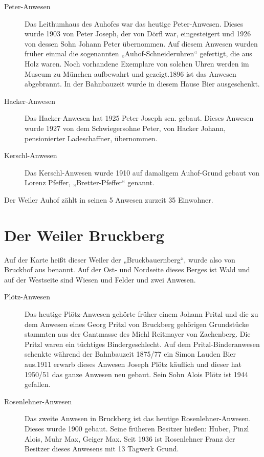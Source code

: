 \documentclass[12pt,a4pager,draft]{book}
\begin{document}
\begin{description}
\item[Peter-Anwesen] Das Leithumhaus des Auhofes war das heutige Peter-Anwesen.
Dieses wurde 1903 von Peter Joseph, der von Dörfl war, eingesteigert und 1926
von dessen Sohn Johann Peter übernommen. Auf diesem Anwesen wurden früher einmal
die sogenannten „Auhof-Schneideruhren“ gefertigt, die aus Holz waren. Noch
vorhandene Exemplare von solchen Uhren werden im Museum zu München aufbewahrt
und gezeigt.1896 ist das Anwesen abgebrannt. In der Bahnbauzeit wurde in diesem
Hause Bier ausgeschenkt.

\item[Hacker-Anwesen] Das Hacker-Anwesen hat 1925 Peter Joseph sen. gebaut.
Dieses Anwesen wurde 1927 von dem Schwiegersohne Peter, von Hacker Johann,
pensionierter Ladeschaffner, übernommen.

\item[Kerschl-Anwesen] Das Kerschl-Anwesen wurde 1910 auf damaligem Auhof-Grund
gebaut von Lorenz Pfeffer, „Bretter-Pfeffer“ genannt.
\end{description}

Der Weiler Auhof zählt in seinen 5 Anwesen zurzeit 35 Einwohner.

\section{Der Weiler Bruckberg}

Auf der Karte heißt dieser Weiler der „Bruckbauernberg“, wurde also von Bruckhof
aus benannt. Auf der Ost- und Nordseite dieses Berges ist Wald und auf der
Westseite sind Wiesen und Felder und zwei Anwesen.

\begin{description}
\item[Plötz-Anwesen] Das heutige Plötz-Anwesen gehörte früher einem Johann
Pritzl und die zu dem Anwesen eines Georg Pritzl von Bruckberg gehörigen
Grundstücke stammten aus der Gantmasse des Michl Reitmayer von Zachenberg. Die
Pritzl waren ein tüchtiges Bindergeschlecht. Auf dem Pritzl-Binderanwesen
schenkte während der Bahnbauzeit 1875/77 ein Simon Lauden Bier aus.1911 erwarb
dieses Anwesen Joseph Plötz käuflich und dieser hat 1950/51 das ganze Anwesen
neu gebaut. Sein Sohn Alois Plötz ist 1944 gefallen.

\item[Rosenlehner-Anwesen] Das zweite Anwesen in Bruckberg ist das heutige
Rosenlehner-Anwesen. Dieses wurde 1900 gebaut. Seine früheren Besitzer hießen:
Huber, Pinzl Alois, Muhr Max, Geiger Max. Seit 1936 ist Rosenlehner Franz der
Besitzer dieses Anwesens mit 13 Tagwerk Grund.
\end{description}
\end{document}
